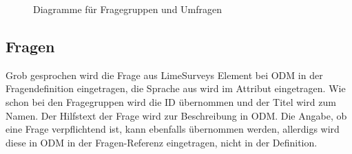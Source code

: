 \begin{figure}[h]
		\caption{Diagramme für Fragegruppen und Umfragen}
\end{figure}

\subsection{Fragen}

Grob gesprochen wird die Frage aus LimeSurveys  Element bei ODM in  der Fragendefinition eingetragen, die Sprache aus  wird im Attribut  eingetragen.
Wie schon bei den Fragegruppen wird die ID übernommen und der Titel wird zum Namen.
Der Hilfstext der Frage wird zur Beschreibung in ODM.
Die Angabe, ob eine Frage verpflichtend ist, kann ebenfalls übernommen werden, allerdigs wird diese in ODM in der Fragen-Referenz eingetragen, nicht in der Definition.

